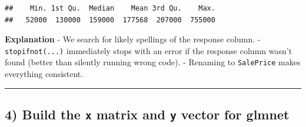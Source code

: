 \documentclass[
]{article}
\newenvironment{Shaded}{\begin{snugshade}}{\end{snugshade}}
\newcommand{\AttributeTok}[1]{\textcolor[rgb]{0.13,0.29,0.53}{#1}}
\newcommand{\DecValTok}[1]{\textcolor[rgb]{0.00,0.00,0.81}{#1}}
\newcommand{\FunctionTok}[1]{\textcolor[rgb]{0.13,0.29,0.53}{\textbf{#1}}}
\newcommand{\NormalTok}[1]{#1}
\newcommand{\OtherTok}[1]{\textcolor[rgb]{0.56,0.35,0.01}{#1}}
\newcommand{\SpecialCharTok}[1]{\textcolor[rgb]{0.81,0.36,0.00}{\textbf{#1}}}
\newcommand{\StringTok}[1]{\textcolor[rgb]{0.31,0.60,0.02}{#1}}
\begin{document}
\begin{Shaded}
\end{Shaded}

\begin{verbatim}
##    Min. 1st Qu.  Median    Mean 3rd Qu.    Max. 
##   52000  130000  159000  177568  207000  755000
\end{verbatim}

\textbf{Explanation} - We search for likely spellings of the response
column. - \texttt{stopifnot(...)} immediately stops with an error if the
response column wasn't found (better than silently running wrong code).
- Renaming to \texttt{SalePrice} makes everything consistent.

\begin{center}\rule{0.5\linewidth}{0.5pt}\end{center}

\subsection{\texorpdfstring{4) Build the \texttt{x} matrix and
\texttt{y} vector for
glmnet}{4) Build the x matrix and y vector for glmnet}}\label{build-the-x-matrix-and-y-vector-for-glmnet}
\end{document}
